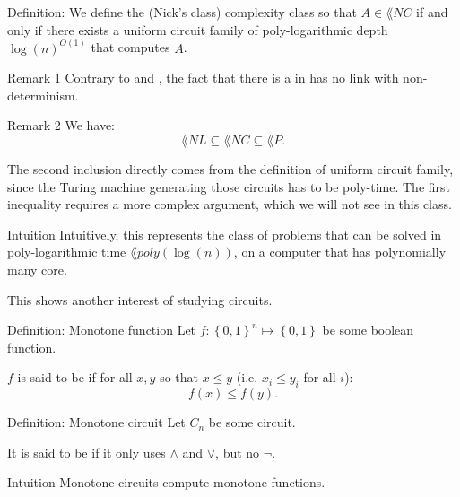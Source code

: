 \documentclass[a4paper]{article}
\begin{document}
\begin{parag}{Definition: }
    We define the  (Nick's class) complexity class so that $A \in \lang{NC}$ if and only if there exists a uniform circuit family of poly-logarithmic depth $\log\left(n\right)^{O\left(1\right)}$ that computes $A$.

    \begin{subparag}{Remark 1}
        Contrary to  and , the fact that there is a  in  has no link with non-determinism. 
    \end{subparag}

    \begin{subparag}{Remark 2}
        We have: 
        \[\lang{NL} \subseteq \lang{NC} \subseteq \lang{P}.\]
        
        The second inclusion directly comes from the definition of uniform circuit family, since the Turing machine generating those circuits has to be poly-time. The first inequality requires a more complex argument, which we will not see in this class.
    \end{subparag}

    \begin{subparag}{Intuition}
        Intuitively, this represents the class of problems that can be solved in poly-logarithmic time $\lang{poly}\left(\log\left(n\right)\right)$, on a computer that has polynomially many core.

        This shows another interest of studying circuits.
    \end{subparag}
\end{parag}

\begin{parag}{Definition: Monotone function}
    Let $f: \left\{0, 1\right\}^n \mapsto \left\{0, 1\right\}$ be some boolean function.

    $f$ is said to be  if for all $x, y$ so that $x \leq y$ (i.e. $x_i \leq y_i$ for all $i$): 
    \[f\left(x\right) \leq f\left(y\right).\]
\end{parag}

\begin{parag}{Definition: Monotone circuit}
    Let $C_n$ be some circuit.

    It is said to be  if it only uses $\land$ and $\lor$, but no $\lnot$.

    \begin{subparag}{Intuition}
        Monotone circuits compute monotone functions.
    \end{subparag}
\end{parag}
\end{document}
